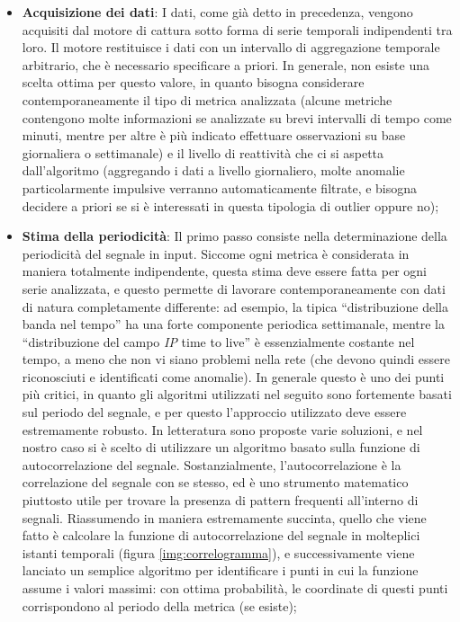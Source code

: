 \documentclass[12pt,a4paper,cucitura]{toptesi}
\begin{document}
\begin{itemize}
\item \textbf{Acquisizione dei dati}: I dati, come già detto in precedenza, vengono acquisiti dal motore di cattura sotto forma di serie temporali indipendenti tra loro.
Il motore restituisce i dati con un intervallo di aggregazione temporale arbitrario, che è necessario specificare a priori.
In generale, non esiste una scelta ottima per questo valore, in quanto bisogna considerare contemporaneamente il tipo di metrica analizzata (alcune metriche contengono molte informazioni se analizzate su brevi intervalli di tempo come minuti, mentre per altre è più indicato effettuare osservazioni su base giornaliera o settimanale) e il livello di reattività che ci si aspetta dall'algoritmo (aggregando i dati a livello giornaliero, molte anomalie particolarmente impulsive verranno automaticamente filtrate, e bisogna decidere a priori se si è interessati in questa tipologia di outlier oppure no); 
\item \textbf{Stima della periodicità}: Il primo passo consiste nella determinazione della periodicità del segnale in input. 
Siccome ogni metrica è considerata in maniera totalmente indipendente, questa stima deve essere fatta per ogni serie analizzata, e questo permette di lavorare contemporaneamente con dati di natura completamente differente: ad esempio, la tipica ``distribuzione della banda nel tempo'' ha una forte componente periodica settimanale, mentre la ``distribuzione del campo \emph{IP} time to live'' è essenzialmente costante nel tempo, a meno che non vi siano problemi nella rete (che devono quindi essere riconosciuti e identificati come anomalie).
In generale questo è uno dei punti più critici, in quanto gli algoritmi utilizzati nel seguito sono fortemente basati sul periodo del segnale, e per questo l'approccio utilizzato deve essere estremamente robusto.
In letteratura sono proposte varie soluzioni, e nel nostro caso si è scelto di utilizzare un algoritmo basato sulla funzione di autocorrelazione del segnale.
Sostanzialmente, l'autocorrelazione è la correlazione del segnale con se stesso, ed è uno strumento matematico piuttosto utile per trovare la presenza di pattern frequenti all'interno di segnali.
Riassumendo in maniera estremamente succinta, quello che viene fatto è calcolare la funzione di autocorrelazione del segnale in molteplici istanti temporali (figura \ref{img:correlogramma}), e successivamente viene lanciato un semplice algoritmo per identificare i punti in cui la funzione assume i valori massimi: con ottima probabilità, le coordinate di questi punti corrispondono al periodo della metrica (se esiste);


\end{itemize}
\end{document}
